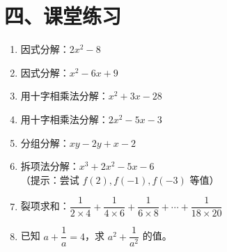 \documentclass[12pt, a4paper]{ctexart}
\begin{document}
\section*{\textcolor{tipgreen}{四、课堂练习}}

\begin{enumerate}[leftmargin=18pt, label=\textbf{\arabic*.}, itemsep=8pt]
\item 因式分解：$2x^2 - 8$

\item 因式分解：$x^2 - 6x + 9$

\item 用十字相乘法分解：$x^2 + 3x - 28$

\item 用十字相乘法分解：$2x^2 - 5x - 3$

\item 分组分解：$xy - 2y + x - 2$

\item 拆项法分解：$x^3 + 2x^2 - 5x - 6$\\
{\small（提示：尝试 $f(2), f(-1), f(-3)$ 等值）}

\item 裂项求和：$\dfrac{1}{2\times4} + \dfrac{1}{4\times6} + \dfrac{1}{6\times8} + \cdots + \dfrac{1}{18\times20}$

\item 已知 $a + \dfrac{1}{a} = 4$，求 $a^2 + \dfrac{1}{a^2}$ 的值。
\end{enumerate}
\end{document}
